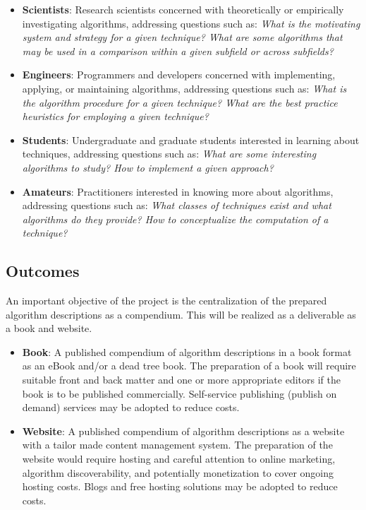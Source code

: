 \documentclass[a4paper, 11pt]{article}
\begin{document}
\begin{itemize}
	\item \textbf{Scientists}: Research scientists concerned with theoretically or empirically investigating algorithms, addressing questions such as: \emph{What is the motivating system and strategy for a given technique? What are some algorithms that may be used in a comparison within a given subfield or across subfields?}
	\item \textbf{Engineers}: Programmers and developers concerned with implementing, applying, or maintaining algorithms, addressing questions such as: \emph{What is the algorithm procedure for a given technique? What are the best practice heuristics for employing a given technique?}
	\item \textbf{Students}: Undergraduate and graduate students interested in learning about techniques, addressing questions such as: \emph{What are some interesting algorithms to study? How to implement a given approach?}
	\item \textbf{Amateurs}: Practitioners interested in knowing more about algorithms, addressing questions such as: \emph{What classes of techniques exist and what algorithms do they provide? How to conceptualize the computation of a technique?}
\end{itemize}

\subsection{Outcomes}
An important objective of the project is the centralization of the prepared algorithm descriptions as a compendium. This will be realized as a deliverable as a book and website.

\begin{itemize}
	\item \textbf{Book}: A published compendium of algorithm descriptions in a book format as an eBook and/or a dead tree book. The preparation of a book will require suitable front and back matter and one or more appropriate editors if the book is to be published commercially. Self-service publishing (publish on demand) services may be adopted to reduce costs.
	\item \textbf{Website}: A published compendium of algorithm descriptions as a website with a tailor made content management system. The preparation of the website would require hosting and careful attention to online marketing, algorithm discoverability, and potentially monetization to cover ongoing hosting costs. Blogs and free hosting solutions may be adopted to reduce costs.
\end{itemize} 
\end{document}
